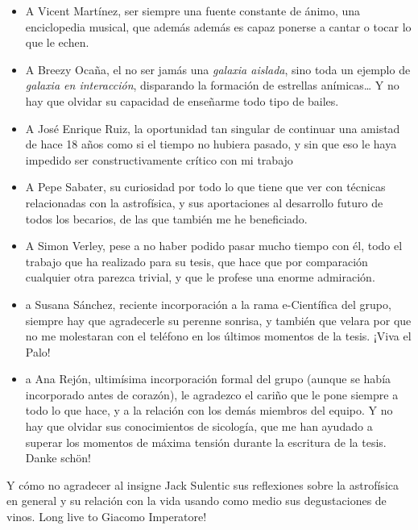 \begin{itemize}
		 \item A Vicent Martínez, ser siempre una fuente constante
		de ánimo, una enciclopedia musical, que además además es
		capaz ponerse a cantar o tocar lo que le echen.
		
		 \item A Breezy Ocaña, el no ser jamás una \emph{galaxia
		aislada}, sino toda un ejemplo de \emph{galaxia en
		interacción}, disparando la formación de estrellas anímicas…
		Y no hay que olvidar su capacidad de enseñarme todo tipo de
		bailes.
		
		 \item A José Enrique Ruiz, la oportunidad tan singular de
		continuar una amistad de hace 18 años como si el tiempo no
		hubiera pasado, y sin que eso le haya impedido ser
		constructivamente crítico con mi trabajo
		
		 \item A Pepe Sabater, su curiosidad por todo lo que tiene
		que ver con técnicas relacionadas con la astrofísica, y sus
		aportaciones al desarrollo futuro de todos los becarios, de
		las que también me he beneficiado.
		
		 \item A Simon Verley, pese a no haber podido pasar mucho
		tiempo con él, todo el trabajo que ha realizado para su
		tesis, que hace que por comparación cualquier otra parezca
		trivial, y que le profese una enorme admiración.
		
		\item a Susana Sánchez, reciente incorporación a la rama
		e-Científica del grupo, siempre hay que agradecerle su
		perenne sonrisa, y también que velara por que no me
		molestaran con el teléfono en los últimos momentos de la
		tesis. ¡Viva el Palo!
		
		\item a Ana Rejón, ultimísima incorporación formal del
		grupo (aunque se había incorporado antes de corazón), le
		agradezco el cariño que le pone siempre a todo lo que hace,
		y a la relación con los demás miembros del equipo. Y no hay
		que olvidar sus conocimientos de sicología, que me han
		ayudado a superar los momentos de máxima tensión durante la
		escritura de la tesis. Danke schön!
	\end{itemize}
	
	Y cómo no agradecer al insigne Jack Sulentic sus reflexiones
	sobre la astrofísica en general y su relación con la vida
	usando como medio sus degustaciones de vinos. Long live to
	Giacomo Imperatore!
	

